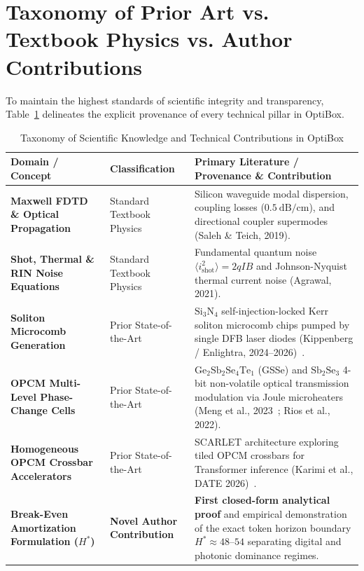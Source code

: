 \documentclass[11pt,a4paper]{report}
\begin{document}
\section{Taxonomy of Prior Art vs. Textbook Physics vs. Author Contributions}
To maintain the highest standards of scientific integrity and transparency, Table~\ref{tab:taxonomy} delineates the explicit provenance of every technical pillar in OptiBox.

\begin{table}[htbp]
\centering
\small
\caption{Taxonomy of Scientific Knowledge and Technical Contributions in OptiBox}
\label{tab:taxonomy}
\begin{tabular}{p{3.2cm}p{4.2cm}p{6.8cm}}
\toprule
\textbf{Domain / Concept} & \textbf{Classification} & \textbf{Primary Literature / Provenance \& Contribution} \\
\midrule
\textbf{Maxwell FDTD \& Optical Propagation} & Standard Textbook Physics & Silicon waveguide modal dispersion, coupling losses ($0.5\ \text{dB/cm}$), and directional coupler supermodes (Saleh \& Teich, 2019). \\
\addlinespace
\textbf{Shot, Thermal \& RIN Noise Equations} & Standard Textbook Physics & Fundamental quantum noise $\langle i_{\text{shot}}^2 \rangle = 2qIB$ and Johnson-Nyquist thermal current noise (Agrawal, 2021). \\
\addlinespace
\textbf{Soliton Microcomb Generation} & Prior State-of-the-Art & $\text{Si}_3\text{N}_4$ self-injection-locked Kerr soliton microcomb chips pumped by single DFB laser diodes (Kippenberg / Enlightra, 2024--2026)~\cite{Meyer2026}. \\
\addlinespace
\textbf{OPCM Multi-Level Phase-Change Cells} & Prior State-of-the-Art & $\text{Ge}_2\text{Sb}_2\text{Se}_4\text{Te}_1$ (GSSe) and $\text{Sb}_2\text{Se}_3$ 4-bit non-volatile optical transmission modulation via Joule microheaters (Meng et al., 2023~\cite{Meng2023}; Rios et al., 2022). \\
\addlinespace
\textbf{Homogeneous OPCM Crossbar Accelerators} & Prior State-of-the-Art & SCARLET architecture exploring tiled OPCM crossbars for Transformer inference (Karimi et al., DATE 2026)~\cite{Karimi2026}. \\
\addlinespace
\textbf{Break-Even Amortization Formulation ($H^*$)} & \textbf{Novel Author Contribution} & \textbf{First closed-form analytical proof} and empirical demonstration of the exact token horizon boundary $H^* \approx 48\text{--}54$ separating digital and photonic dominance regimes. \\

\end{tabular}
\end{table}
\end{document}
